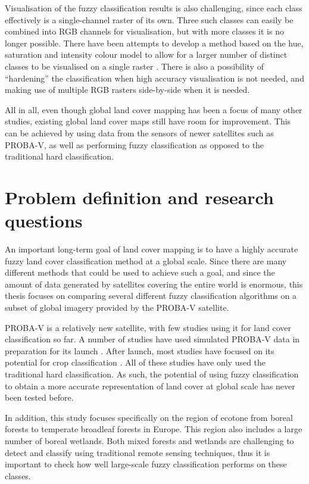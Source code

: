 \documentclass[a4paper,10pt]{book}
\begin{document}
Visualisation of the fuzzy classification results is also challenging, since each class effectively is a single-channel raster of its own. Three such classes can easily be combined into RGB channels for visualisation, but with more classes it is no longer possible. There have been attempts to develop a method based on the hue, saturation and intensity colour model to allow for a larger number of distinct classes to be visualised on a single raster \citep{hengl2004fuzzycmeans}. There is also a possibility of ``hardening'' the classification when high accuracy visualisation is not needed, and making use of multiple RGB rasters side-by-side when it is needed.

All in all, even though global land cover mapping has been a focus of many other studies, existing global land cover maps still have room for improvement. This can be achieved by using data from the sensors of newer satellites such as PROBA-V, as well as performing fuzzy classification as opposed to the traditional hard classification.

\chapter{Problem definition and research questions}

An important long-term goal of land cover mapping is to have a highly accurate fuzzy land cover classification method at a global scale. Since there are many different methods that could be used to achieve such a goal, and since the amount of data generated by satellites covering the entire world is enormous, this thesis focuses on comparing several different fuzzy classification algorithms on a subset of global imagery provided by the PROBA-V satellite.

PROBA-V is a relatively new satellite, with few studies using it for land cover classification so far. A number of studies have used simulated PROBA-V data in preparation for its launch \citep{stathakis2014probavurban,roumenina2013probavcrops,bartalev2014probavboreal}. After launch, most studies have focused on its potential for crop classification \citep{roumenina2015probavcrops,durgun2016crop,lambert2016cropland}. All of these studies have only used the traditional hard classification. As such, the potential of using fuzzy classification to obtain a more accurate representation of land cover at global scale has never been tested before.

In addition, this study focuses specifically on the region of ecotone from boreal forests to temperate broadleaf forests in Europe. This region also includes a large number of boreal wetlands. Both mixed forests and wetlands are challenging to detect and classify using traditional remote sensing techniques, thus it is important to check how well large-scale fuzzy classification performs on these classes.
\end{document}
